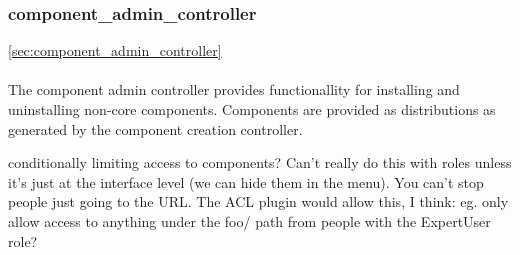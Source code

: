 \subsubsection{component_admin_controller}
\ref{sec:component_admin_controller}

\paragraph{}
The component admin controller provides functionallity for installing and uninstalling non-core components. Components are provided as distributions as generated by the component creation controller. 

conditionally limiting access to components? Can't really do this with roles unless it's just at the interface level (we can hide them in the menu). You can't stop people just going to the URL. The ACL plugin would allow this, I think: eg. only allow access to anything under the foo/ path from people with the ExpertUser role?